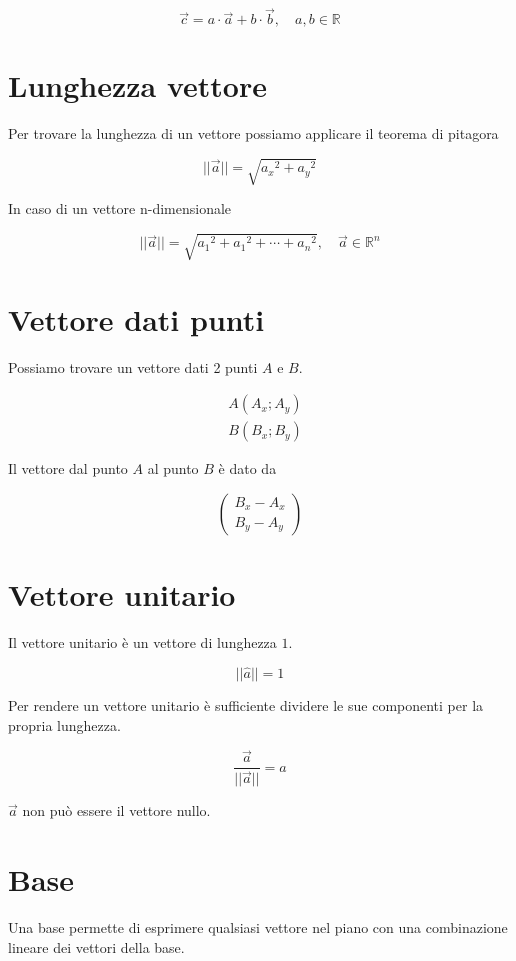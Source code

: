 \documentclass{article}
\begin{document}
\[
    \vec{c} = a \cdot\vec{a} + b\cdot\vec{b},
    \quad a,b\in \mathbb{R}
\]

\section{Lunghezza vettore}

Per trovare la lunghezza di un vettore possiamo applicare il teorema di pitagora

\[
    ||\vec{a}|| = \sqrt{{a_x}^2 + {a_y}^2}
\]

In caso di un vettore n-dimensionale

\[
    ||\vec{a}|| = \sqrt{{a_1}^2 + {a_1}^2 + \cdots + {a_n}^2},
    \quad \vec{a}\in\mathbb{R}^n
\]

\section{Vettore dati punti}

Possiamo trovare un vettore dati 2 punti \(A\) e \(B\).

\begin{align*}
    &A(A_x; A_y) \\
    &B(B_x; B_y)
\end{align*}

Il vettore dal punto \(A\) al punto \(B\) è dato da

\[
    \begin{pmatrix}
        B_x - A_x \\
        B_y - A_y
    \end{pmatrix}
\]

\section{Vettore unitario}

Il vettore unitario è un vettore di lunghezza \(1\).

\[
    ||\hat{a}|| = 1
\]

Per rendere un vettore unitario è sufficiente dividere le sue componenti per la propria lunghezza.

\[
    \frac{\vec{a}}{||\vec{a}||}=\hat{a}
\]

\(\vec{a}\) non può essere il vettore nullo.

\section{Base}

Una base permette di esprimere qualsiasi vettore nel piano con una combinazione lineare dei vettori della base.
\end{document}
